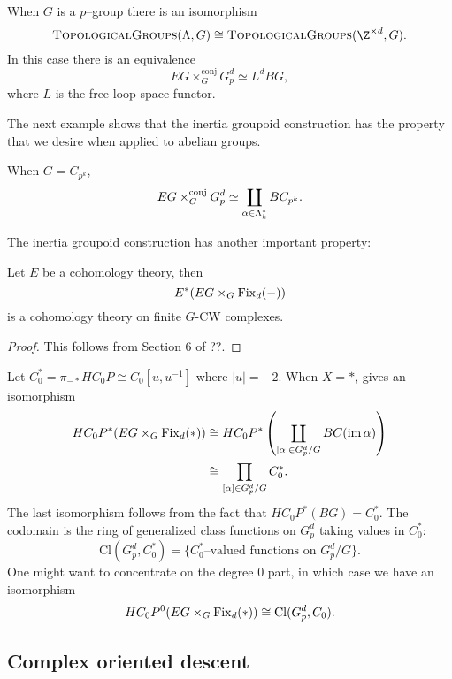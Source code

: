\begin{example}
When $G$ is a $p$--group there is an isomorphism
\[
\CatOf{TopologicalGroups}(\Lambda,G) \cong \CatOf{TopologicalGroups}(\Z^{\times d}, G).
\]
In this case there is an equivalence
\[
EG \times_{G}^{\mathrm{conj}} G_{p}^{d} \simeq L^dBG,
\]
where $L$ is the free loop space functor. 
\end{example}

The next example shows that the inertia groupoid construction has the property that we desire when applied to abelian groups.
\begin{example} \label{zpk}
When $G = C_{p^k}$,
\[
EG \times_{G}^{\text{conj}} G_{p}^{d} \simeq \coprod_{\alpha \in \Lambda_k^*} BC_{p^k}.
\]
\end{example}

The inertia groupoid construction has another important property: 
\begin{proposition}
Let $E$ be a cohomology theory, then
\[
E^*(EG \times_G \operatorname{Fix}_d(-))
\]
is a cohomology theory on finite $G$-CW complexes.
\end{proposition}
\begin{proof}
This follows from Section 6 of ??.
\end{proof}




\begin{example} \label{app:classfncs}
Let $C_{0}^{*} = \pi_{-*}HC_0P \cong C_0[u,u^{-1}]$ where $|u|=-2$. When $X = *$,  gives an isomorphism
\begin{align*}
HC_{0}P^*(EG \times_G \operatorname{Fix}_d(*)) &\cong HC_{0}P^{*}\left(\coprod_{[\alpha] \in G_{p}^{d}/G} BC(\operatorname{im} \alpha)\right) \\
&\cong \prod_{[\alpha] \in G_{p}^{d}/G}C_{0}^{*}.
\end{align*}
The last isomorphism follows from the fact that $HC_{0}P^{*}(BG) = C_{0}^{*}$. The codomain is the ring of generalized class functions on $G_{p}^{d}$ taking values in $C_{0}^{*}$:
\[
\mathrm{Cl}(G_{p}^{d}, C_{0}^{*}) = \{C_{0}^{*} \text{--valued functions on } G_{p}^{d}/G\}.
\]
One might want to concentrate on the degree $0$ part, in which case we have an isomorphism
\[
HC_{0}P^0(EG \times_G \operatorname{Fix}_d(*)) \cong \mathrm{Cl}(G_{p}^{d}, C_{0}).
\]
\end{example}


\subsection*{Complex oriented descent}

